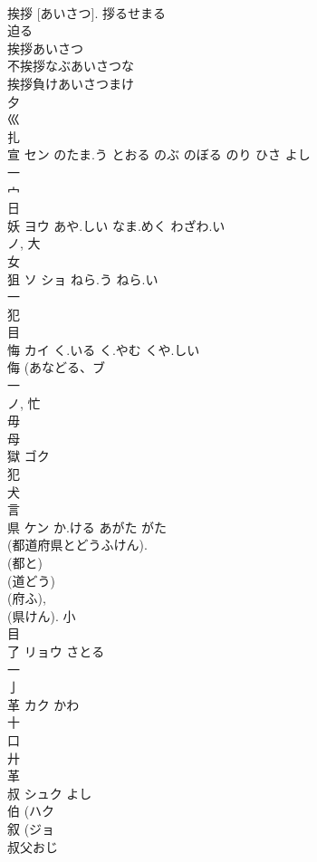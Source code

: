 \documentclass[8pt]{extreport}
\begin{document}
\begin{CJK}{UTF8}{min}
\\	挨拶 [あいさつ].		拶るせまる 
\\	迫る
\\	挨拶あいさつ
\\	不挨拶なぶあいさつな
\\	挨拶負けあいさつまけ
\\	夕 
\\	巛 
\\	扎	
\\	宣	セン	のたま.う とおる のぶ のぼる のり ひさ よし	
\\	一 
\\	宀 
\\	日 
\\	妖	ヨウ	あや.しい なま.めく わざわ.い	
\\	ノ, 大 
\\	女 
\\	狙	ソ ショ	ねら.う ねら.い	
\\	一 
\\	犯 
\\	目 
\\	悔	カイ	く.いる く.やむ くや.しい	
\\	侮 (あなどる、ブ 
\\	一 
\\	ノ, 忙 
\\	毋 
\\	母 
\\	獄	ゴク		
\\	犯 
\\	犬 
\\	言 
\\	県	ケン	か.ける あがた がた	
\\	(都道府県とどうふけん). 
\\	(都と) 
\\	(道どう) 
\\	(府ふ), 
\\	(県けん).		小 
\\	目 
\\	了	リョウ	さとる	
\\	一 
\\	亅 
\\	革	カク	かわ	
\\	十 
\\	口 
\\	廾 
\\	革 
\\	叔	シュク	よし	
\\	伯 (ハク 
\\	叙 (ジョ 
\\	叔父おじ

\end{CJK}
\end{document}
